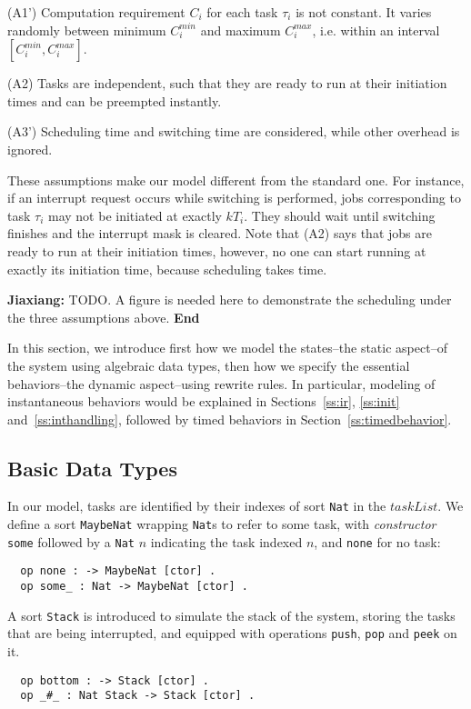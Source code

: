 \documentclass{llncs}
\newcommand{\jx}[1]{{\bf Jiaxiang: }#1{ \bf End}}
\begin{document}
(A1') Computation requirement $C_i$ for each task $\tau_i$ is not
constant. It varies randomly between minimum $C^{min}_i$ and maximum
$C^{max}_i$, i.e. within an interval $[C^{min}_i, C^{max}_i]$.

(A2) Tasks are independent, such that they are ready to run at their
initiation times and can be preempted instantly.

(A3') Scheduling time and switching time are considered, while other
overhead is ignored.

These assumptions make our model different from the standard one. For
instance, if an interrupt request occurs while switching is performed,
jobs corresponding to task $\tau_i$ may not be initiated at exactly
$kT_i$. They should wait until switching finishes and the interrupt
mask is cleared. Note that (A2) says that jobs are ready to run at
their initiation times, however, no one can start running at exactly
its initiation time, because scheduling takes time.

\jx{TODO. A figure is needed here to demonstrate the scheduling under
  the three assumptions above.}

In this section, we introduce first how we model the states--the
static aspect--of the system using algebraic data types, then how we
specify the essential behaviors--the dynamic aspect--using rewrite
rules. In particular, modeling of instantaneous behaviors would be
explained in Sections~\ref{ss:ir}, \ref{ss:init}
and~\ref{ss:inthandling}, followed by timed behaviors in
Section~\ref{ss:timedbehavior}.

\subsection{Basic Data Types}
In our model, tasks are identified by their indexes of sort \verb|Nat|
in the $taskList$. We define a sort \verb|MaybeNat| wrapping
\verb|Nat|s to refer to some task, with \emph{constructor} \verb|some|
followed by a \verb|Nat| $n$ indicating the task indexed $n$, and
\verb|none| for no task:
\begin{verbatim}
  op none : -> MaybeNat [ctor] .
  op some_ : Nat -> MaybeNat [ctor] .
\end{verbatim}

A sort \verb|Stack| is introduced to simulate the stack of the system,
storing the tasks that are being interrupted, and equipped with
operations \verb|push|, \verb|pop| and \verb|peek| on it.
\begin{verbatim}
  op bottom : -> Stack [ctor] .
  op _#_ : Nat Stack -> Stack [ctor] .
\end{verbatim}
\end{document}
